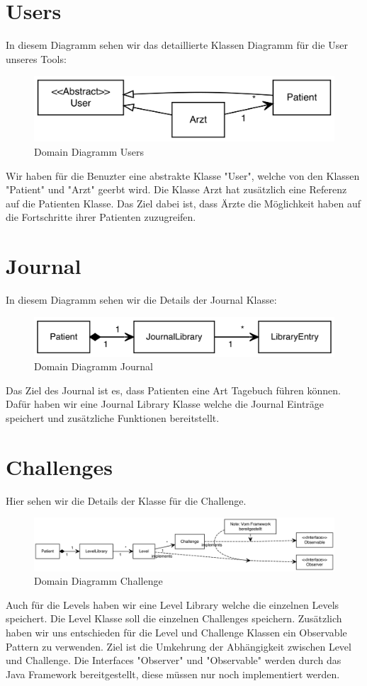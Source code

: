\section{Users}
In diesem Diagramm sehen wir das detaillierte Klassen Diagramm für die User unseres Tools:
\begin{figure}[H]
\centering
\includegraphics[width=1\textwidth]{../DomainDiagramms/Users.png}
\caption{Domain Diagramm Users}
\end{figure}
Wir haben für die Benuzter eine abstrakte Klasse "User", welche von den Klassen "Patient" und "Arzt" geerbt wird. Die Klasse Arzt hat zusätzlich eine Referenz auf die Patienten Klasse. Das Ziel dabei ist, dass Ärzte die Möglichkeit haben auf die Fortschritte ihrer Patienten zuzugreifen.

\section{Journal}
In diesem Diagramm sehen wir die Details der Journal Klasse:
\begin{figure}[H]
\centering
\includegraphics[width=1\textwidth]{../DomainDiagramms/Journal.png}
\caption{Domain Diagramm Journal}
\end{figure}
Das Ziel des Journal ist es, dass Patienten eine Art Tagebuch führen können. Dafür haben wir eine Journal Library Klasse welche die Journal Einträge speichert und zusätzliche Funktionen bereitstellt.
\newpage
\section{Challenges}
Hier sehen wir die Details der Klasse für die Challenge.
\begin{figure}[H]
\centering
\includegraphics[width=1\textwidth]{../DomainDiagramms/Challange.png}
\caption{Domain Diagramm Challenge}
\end{figure}
Auch für die Levels haben wir eine Level Library welche die einzelnen Levels speichert. Die Level Klasse soll die einzelnen Challenges speichern. Zusätzlich haben wir uns entschieden für die Level und Challenge Klassen ein Observable Pattern zu verwenden. Ziel ist die Umkehrung der Abhängigkeit zwischen Level und Challenge. Die Interfaces "Observer" und "Observable" werden durch das Java Framework bereitgestellt, diese müssen nur noch implementiert werden.


